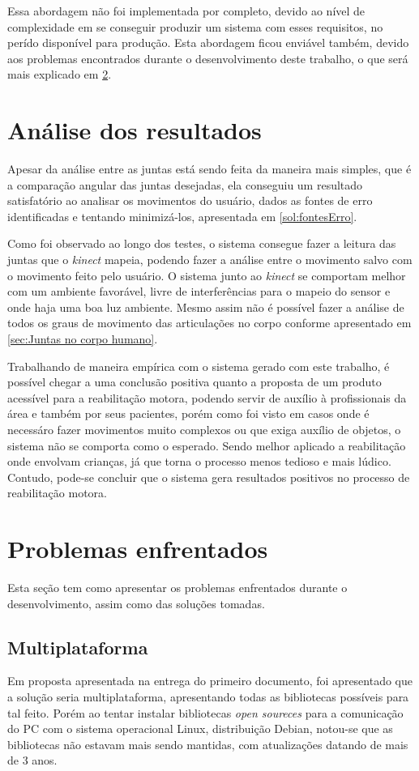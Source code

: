  Essa abordagem não foi implementada por completo, devido ao nível de complexidade em se conseguir produzir um sistema com esses requisitos, no perído disponível para produção. Esta
 abordagem ficou enviável também, devido aos problemas encontrados durante o desenvolvimento deste trabalho, o que será mais explicado em \ref{ch:problemas}.


\section{Análise dos resultados}\label{sol:viabilidade}
Apesar da análise entre as juntas está sendo feita da maneira mais simples, que é a comparação angular das juntas desejadas, ela conseguiu um resultado satisfatório
ao analisar os movimentos do usuário, dados as fontes de erro identificadas e tentando minimizá-los, apresentada em \ref{sol:fontesErro}.

Como foi observado ao longo dos testes, o sistema consegue fazer a leitura das juntas  que o \textit{kinect} mapeia, podendo fazer a análise entre o movimento
salvo com o movimento feito pelo usuário. O sistema junto ao \textit{kinect} se comportam melhor com um ambiente favorável, livre de interferências para o mapeio do sensor
e onde haja uma boa luz ambiente. Mesmo assim não é possível fazer a análise de todos os graus de movimento das articulações no corpo conforme apresentado em \ref{sec:Juntas no corpo humano}.

  Trabalhando de maneira empírica com o sistema gerado com este trabalho, é possível chegar a uma conclusão positiva quanto a proposta de um produto acessível para a reabilitação motora,
  podendo servir de auxílio à profissionais da área e também por seus pacientes, porém como foi visto em casos onde é necessáro
fazer movimentos muito complexos ou que exiga auxílio de objetos, o sistema não se comporta como o esperado. Sendo melhor aplicado a reabilitação onde envolvam crianças, já que torna o processo
menos tedioso e mais lúdico. Contudo, pode-se concluir que o sistema gera resultados positivos no processo de reabilitação motora.

\section{Problemas enfrentados}\label{ch:problemas}
  Esta seção tem como apresentar os problemas enfrentados durante o desenvolvimento,
  assim como das soluções tomadas.
\subsection{Multiplataforma}\label{pro:Multiplataforma}
  Em proposta apresentada na entrega do primeiro documento, foi apresentado que a solução seria multiplataforma,
apresentando todas as bibliotecas possíveis para tal feito. Porém ao tentar instalar bibliotecas \textit{open soureces}
para a comunicação do PC com o sistema operacional Linux, distribuição Debian, notou-se que as bibliotecas não
estavam mais sendo mantidas, com atualizações datando de mais de 3 anos.

